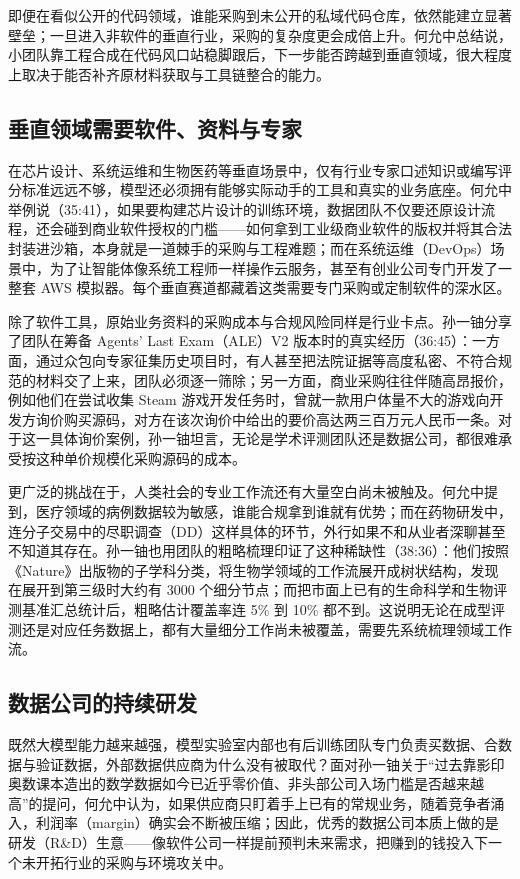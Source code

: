 \documentclass[UTF8,a4paper,11pt,fontset=fandol]{ctexart}
\begin{document}
即便在看似公开的代码领域，谁能采购到未公开的私域代码仓库，依然能建立显著壁垒；一旦进入非软件的垂直行业，采购的复杂度更会成倍上升。何允中总结说，小团队靠工程合成在代码风口站稳脚跟后，下一步能否跨越到垂直领域，很大程度上取决于能否补齐原材料获取与工具链整合的能力。

\subsection{垂直领域需要软件、资料与专家}
在芯片设计、系统运维和生物医药等垂直场景中，仅有行业专家口述知识或编写评分标准远远不够，模型还必须拥有能够实际动手的工具和真实的业务底座。何允中举例说（35:41），如果要构建芯片设计的训练环境，数据团队不仅要还原设计流程，还会碰到商业软件授权的门槛——如何拿到工业级商业软件的版权并将其合法封装进沙箱，本身就是一道棘手的采购与工程难题；而在系统运维（DevOps）场景中，为了让智能体像系统工程师一样操作云服务，甚至有创业公司专门开发了一整套 AWS 模拟器。每个垂直赛道都藏着这类需要专门采购或定制软件的深水区。

除了软件工具，原始业务资料的采购成本与合规风险同样是行业卡点。孙一铀分享了团队在筹备 Agents' Last Exam（ALE）V2 版本时的真实经历（36:45）：一方面，通过众包向专家征集历史项目时，有人甚至把法院证据等高度私密、不符合规范的材料交了上来，团队必须逐一筛除；另一方面，商业采购往往伴随高昂报价，例如他们在尝试收集 Steam 游戏开发任务时，曾就一款用户体量不大的游戏向开发方询价购买源码，对方在该次询价中给出的要价高达两三百万元人民币一条。对于这一具体询价案例，孙一铀坦言，无论是学术评测团队还是数据公司，都很难承受按这种单价规模化采购源码的成本。

更广泛的挑战在于，人类社会的专业工作流还有大量空白尚未被触及。何允中提到，医疗领域的病例数据较为敏感，谁能合规拿到谁就有优势；而在药物研发中，连分子交易中的尽职调查（DD）这样具体的环节，外行如果不和从业者深聊甚至不知道其存在。孙一铀也用团队的粗略梳理印证了这种稀缺性（38:36）：他们按照《Nature》出版物的子学科分类，将生物学领域的工作流展开成树状结构，发现在展开到第三级时大约有 3000 个细分节点；而把市面上已有的生命科学和生物评测基准汇总统计后，粗略估计覆盖率连 5\% 到 10\% 都不到。这说明无论在成型评测还是对应任务数据上，都有大量细分工作尚未被覆盖，需要先系统梳理领域工作流。

\subsection{数据公司的持续研发}
既然大模型能力越来越强，模型实验室内部也有后训练团队专门负责买数据、合数据与验证数据，外部数据供应商为什么没有被取代？面对孙一铀关于“过去靠影印奥数课本造出的数学数据如今已近乎零价值、非头部公司入场门槛是否越来越高”的提问，何允中认为，如果供应商只盯着手上已有的常规业务，随着竞争者涌入，利润率（margin）确实会不断被压缩；因此，优秀的数据公司本质上做的是研发（R\&D）生意——像软件公司一样提前预判未来需求，把赚到的钱投入下一个未开拓行业的采购与环境攻关中。
\end{document}
